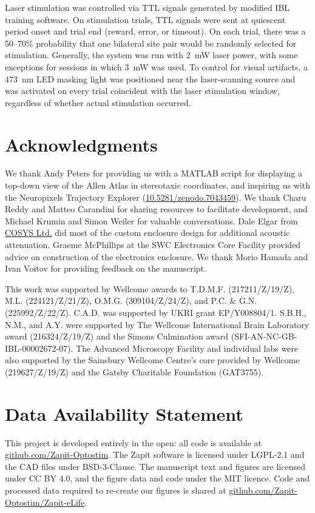 \documentclass[9pt,lineno]{elife}
\begin{document}
Laser stimulation was controlled via TTL signals generated by modified IBL training software.
On stimulation trials, TTL signals were sent at quiescent period onset and trial end (reward, error, or timeout).
On each trial, there was a 50–70\% probability that one bilateral site pair would be randomly selected for stimulation.
Generally, the system was run with 2~mW laser power, with some exceptions for sessions in which 3~mW was used.
To control for visual artifacts, a 473~nm LED masking light was positioned near the laser-scanning source and was activated on every trial coincident with the laser stimulation window, regardless of whether actual stimulation occurred.



\section{Acknowledgments}
We thank Andy Peters for providing us with a MATLAB script for displaying a top-down view of the Allen Atlas in stereotaxic coordinates, and inspiring us with the Neuropixels Trajectory Explorer (\href{https://doi.org/10.5281/zenodo.7043459}{10.5281/zenodo.7043459}).
We thank Charu Reddy and Matteo Carandini for sharing resources to facilitate development, and Michael Krumin and Simon Weiler for valuable conversations.
Dale Elgar from \href{https://www.cosys.org.uk/}{COSYS Ltd.} did most of the custom enclosure design for additional acoustic attenuation.
Graeme McPhillips at the SWC Electronics Core Facility provided advice on construction of the electronics enclosure.
We thank Morio Hamada and Ivan Voitov for providing feedback on the manuscript.

This work was supported by Wellcome awards to T.D.M.F. (217211/Z/19/Z), M.L. (224121/Z/21/Z), O.M.G. (309104/Z/24/Z), and P.C. \& G.N. (225992/Z/22/Z).
C.A.D. was supported by UKRI grant EP/Y008804/1.
S.B.H., N.M., and A.Y. were supported by The Wellcome International Brain Laboratory award (216324/Z/19/Z) and the Simons Culmination award (SFI-AN-NC-GB-IBL-00002672-07).
The Advanced Microscopy Facility and individual labs were also supported by the Sainsbury Wellcome Centre’s core provided by Wellcome (219627/Z/19/Z) and the Gatsby Charitable Foundation (GAT3755).

\section{Data Availability Statement}
This project is developed entirely in the open: all code is available at \href{https://github.com/Zapit-Optostim}{github.com/Zapit-Optostim}.
The Zapit software is licensed under LGPL-2.1 and the CAD files under BSD-3-Clause.
The manuscript text and figures are licensed under CC BY 4.0, and the figure data and code under the MIT licence.
Code and processed data required to re-create our figures is shared at \href{https://github.com/Zapit-Optostim/Zapit-eLife}{github.com/Zapit-Optostim/Zapit-eLife}.
\end{document}
